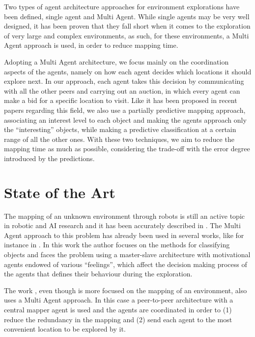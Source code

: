 \documentclass[a4paper, 10pt, conference]{ieeeconf}      %
\begin{document}
Two types of agent architecture approaches for environment explorations have been defined, single agent and Multi Agent. While single agents may be very well designed, it has been proven that they fall short when it comes to the exploration of very large and complex environments, as such, for these environments, a Multi Agent approach is used, in order to reduce mapping time. 

Adopting a Multi Agent architecture, we focus mainly on the coordination aspects of the agents, namely on how each agent decides which locations it should explore next. In our approach, each agent takes this decision by communicating with all the other peers and carrying out an auction, in which every agent can make a bid for a specific location to visit. Like it has been proposed in recent papers regarding this field, we also use a partially predictive mapping approach, associating an interest level to each object and making the agents approach only the ``interesting'' objects, while making a predictive classification at a certain range of all the other ones. With these two techniques, we aim to reduce the mapping time as much as possible, considering the trade-off with the error degree introduced by the predictions. 





\section{State of the Art}
The mapping of an unknown environment through robots is still an active topic in robotic and AI research and it has been accurately described in \cite{thrun2002robotic}. The Multi Agent approach to this problem has already been used in several works, like for instance in \cite{macedo2004exploration}. In this work the author focuses on the methods for classifying objects and faces the problem using a master-slave architecture with motivational agents endowed of various ``feelings'', which affect the decision making process of the agents that defines their behaviour during the exploration. 

The work \cite{simmons2000coordination}, even though is more focused on the mapping of an environment, also uses a Multi Agent approach. In this case a peer-to-peer architecture with a central mapper agent is used and the agents are coordinated in order to (1) reduce the redundancy in the mapping and (2) send each agent to the most convenient location to be explored by it. 
\end{document}
